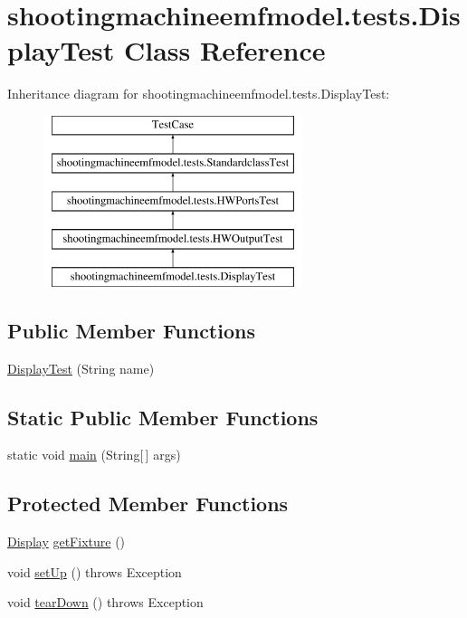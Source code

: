 \hypertarget{classshootingmachineemfmodel_1_1tests_1_1_display_test}{\section{shootingmachineemfmodel.\-tests.\-Display\-Test Class Reference}
\label{classshootingmachineemfmodel_1_1tests_1_1_display_test}
}
Inheritance diagram for shootingmachineemfmodel.\-tests.\-Display\-Test\-:\begin{figure}[H]
\begin{center}
\leavevmode
\includegraphics[height=5.000000cm]{classshootingmachineemfmodel_1_1tests_1_1_display_test}
\end{center}
\end{figure}
\subsection*{Public Member Functions}
\begin{DoxyCompactItemize}
\item 
\hyperlink{classshootingmachineemfmodel_1_1tests_1_1_display_test_af5843e10fcbeb70d71373486444d56fa}{Display\-Test} (String name)
\end{DoxyCompactItemize}
\subsection*{Static Public Member Functions}
\begin{DoxyCompactItemize}
\item 
static void \hyperlink{classshootingmachineemfmodel_1_1tests_1_1_display_test_a2355401f82128b74a63a5c4dd6961d9d}{main} (String\mbox{[}$\,$\mbox{]} args)
\end{DoxyCompactItemize}
\subsection*{Protected Member Functions}
\begin{DoxyCompactItemize}
\item 
\hyperlink{interfaceshootingmachineemfmodel_1_1_display}{Display} \hyperlink{classshootingmachineemfmodel_1_1tests_1_1_display_test_a973f05d61f9fd759cc305dd7670dc44a}{get\-Fixture} ()
\item 
void \hyperlink{classshootingmachineemfmodel_1_1tests_1_1_display_test_a0e4fd3e395c04c8cadc0553e5325512c}{set\-Up} ()  throws Exception 
\item 
void \hyperlink{classshootingmachineemfmodel_1_1tests_1_1_display_test_aa296294b30bef80b026a1f96cebfad04}{tear\-Down} ()  throws Exception 
\end{DoxyCompactItemize}

